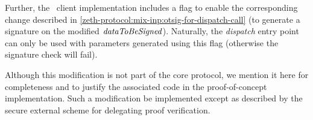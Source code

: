 \begin{remark}
  Further, the \zeth~client implementation includes a flag to enable the corresponding change described in \cref{zeth-protocol:mix-inp:otsig-for-dispatch-call} (to generate a signature on the modified $\mathit{dataToBeSigned}$). Naturally, the \emph{dispatch} entry point can only be used with parameters generated using this flag (otherwise the signature check will fail).

  Although this modification is not part of the core protocol, we mention it here for completeness and to justify the associated code in the proof-of-concept implementation. Such a modification \MUSTNOT{} be implemented except as described by the secure external scheme for delegating proof verification.
\end{remark}
